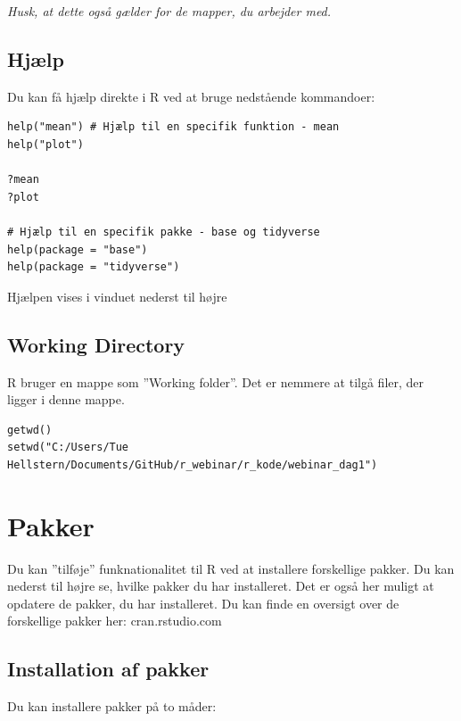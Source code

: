 \documentclass[
]{book}
\begin{document}
\emph{Husk, at dette også gælder for de mapper, du arbejder med.}

\hypertarget{hjuxe6lp}{%
\section{Hjælp}\label{hjuxe6lp}}

Du kan få hjælp direkte i R ved at bruge nedstående kommandoer:

\begin{verbatim}
help("mean") # Hjælp til en specifik funktion - mean
help("plot")

?mean 
?plot

# Hjælp til en specifik pakke - base og tidyverse
help(package = "base")
help(package = "tidyverse")
\end{verbatim}

Hjælpen vises i vinduet nederst til højre

\hypertarget{working-directory}{%
\section{Working Directory}\label{working-directory}}

R bruger en mappe som ''Working folder''. Det er nemmere at tilgå filer, der ligger i denne mappe.

\begin{verbatim}
getwd()
setwd("C:/Users/Tue Hellstern/Documents/GitHub/r_webinar/r_kode/webinar_dag1")
\end{verbatim}

\hypertarget{pakker}{%
\chapter{Pakker}\label{pakker}}

Du kan ''tilføje'' funknationalitet til R ved at installere forskellige pakker. Du kan nederst til højre se, hvilke pakker du har installeret.
Det er også her muligt at opdatere de pakker, du har installeret.
Du kan finde en oversigt over de forskellige pakker her: cran.rstudio.com

\hypertarget{installation-af-pakker}{%
\section{Installation af pakker}\label{installation-af-pakker}}

Du kan installere pakker på to måder:
\end{document}
